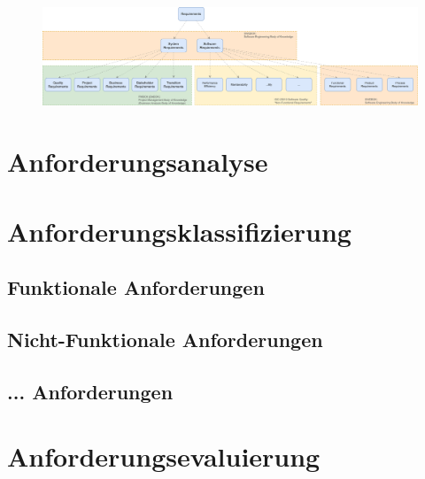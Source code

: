 \begin{figure}[htbp]
 \centering
 \includegraphics[width=1.0\textwidth]{gfx/Requirements_Hierarchy.png}
 \caption{}
 \label{fig:chapter05:requirements_hierarchy}
\end{figure}


%
%
\section{Anforderungsanalyse}
\label{sec:requirements:analysis}
\lipsum[1-1]

%
%
\section{Anforderungsklassifizierung}
\label{sec:requirements:classification}
\lipsum[1-1]

\subsection{Funktionale Anforderungen}
\label{subsec:requirements:classification:functional}
\lipsum[1-1]

\subsection{Nicht-Funktionale Anforderungen}
\label{subsec:requirements:classification:nonfunctional}
\lipsum[1-1]

\subsection{... Anforderungen}
\label{subsec:requirements:classification:other}
\lipsum[1-1]

%
%
\section{Anforderungsevaluierung}
\label{sec:requirements:evaluation}
\lipsum[1-1]
